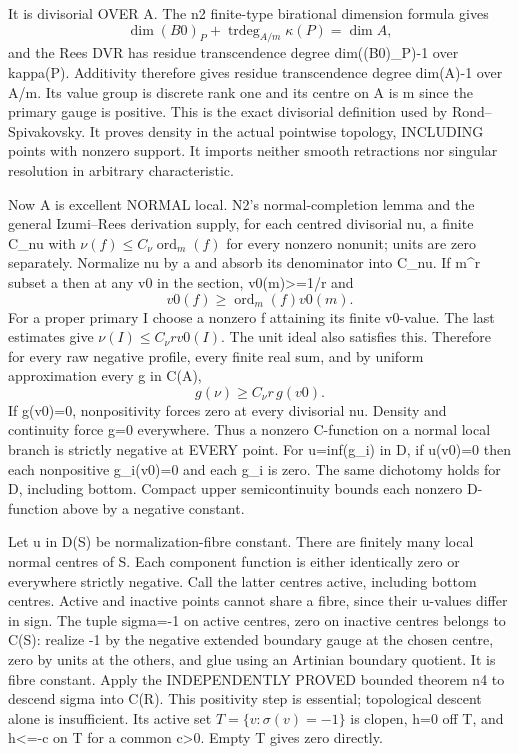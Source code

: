 \documentclass[11pt]{article}
\begin{document}
It is divisorial OVER A. The n2 finite-type birational dimension formula gives
\[
 \dim (B0)_P+\operatorname{trdeg}_{A/m}\kappa(P)=\dim A,
\]
and the Rees DVR has residue transcendence degree dim((B0)\_P)-1 over kappa(P). Additivity therefore gives residue transcendence degree dim(A)-1 over A/m. Its value group is discrete rank one and its centre on A is m since the primary gauge is positive. This is the exact divisorial definition used by Rond--Spivakovsky. It proves density in the actual pointwise topology, INCLUDING points with nonzero support. It imports neither smooth retractions nor singular resolution in arbitrary characteristic.

Now A is excellent NORMAL local. N2's normal-completion lemma and the general Izumi--Rees derivation supply, for each centred divisorial nu, a finite C\_nu with \(\nu(f)\le C_\nu\operatorname{ord}_m(f)\) for every nonzero nonunit; units are zero separately. Normalize nu by a and absorb its denominator into C\_nu. If m\textasciicircum{}r subset a then at any v0 in the section, v0(m)>=1/r and
\[
 v0(f)\ge\operatorname{ord}_m(f)v0(m).
\]
For a proper primary I choose a nonzero f attaining its finite v0-value. The last estimates give \(\nu(I)\le C_\nu r v0(I)\). The unit ideal also satisfies this. Therefore for every raw negative profile, every finite real sum, and by uniform approximation every g in C(A),
\[
 g(\nu)\ge C_\nu r\,g(v0).
\]
If g(v0)=0, nonpositivity forces zero at every divisorial nu. Density and continuity force g=0 everywhere. Thus a nonzero C-function on a normal local branch is strictly negative at EVERY point. For u=inf(g\_i) in D, if u(v0)=0 then each nonpositive g\_i(v0)=0 and each g\_i is zero. The same dichotomy holds for D, including bottom. Compact upper semicontinuity bounds each nonzero D-function above by a negative constant.

Let u in D(S) be normalization-fibre constant. There are finitely many local normal centres of S. Each component function is either identically zero or everywhere strictly negative. Call the latter centres active, including bottom centres. Active and inactive points cannot share a fibre, since their u-values differ in sign. The tuple sigma=-1 on active centres, zero on inactive centres belongs to C(S): realize -1 by the negative extended boundary gauge at the chosen centre, zero by units at the others, and glue using an Artinian boundary quotient. It is fibre constant. Apply the INDEPENDENTLY PROVED bounded theorem n4 to descend sigma into C(R). This positivity step is essential; topological descent alone is insufficient. Its active set \(T=\{v:\sigma(v)=-1\}\) is clopen, h=0 off T, and h<=-c on T for a common c>0. Empty T gives zero directly.
\end{document}
